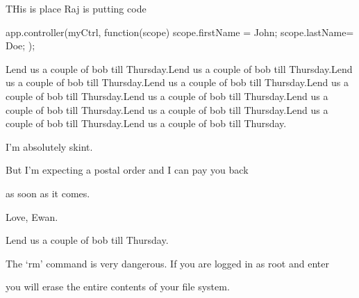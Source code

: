 \documentclass[letterpaper,10pt,english]{sphinxmanual}
\begin{document}
\begin{sphinxVerbatim}[commandchars=\\\{\}]
   
   
\end{sphinxVerbatim}

\begin{DUlineblock}{0em}
\item[] THis is place Raj is putting code
\end{DUlineblock}

\begin{sphinxVerbatim}[commandchars=\\\{\}]
app.controller(\PYGZdq{}myCtrl\PYGZdq{}, function(\PYGZdl{}scope) \PYGZob{}
  \PYGZdl{}scope.firstName = \PYGZdq{}John\PYGZdq{};
  \PYGZdl{}scope.lastName= \PYGZdq{}Doe\PYGZdq{};
\PYGZcb{});
\end{sphinxVerbatim}

\begin{DUlineblock}{0em}
\item[] Lend us a couple of bob till Thursday.Lend us a couple of bob till Thursday.Lend us a couple of bob till Thursday.Lend us a couple of bob till Thursday.Lend us a couple of bob till Thursday.Lend us a couple of bob till Thursday.Lend us a couple of bob till Thursday.Lend us a couple of bob till Thursday.Lend us a couple of bob till Thursday.Lend us a couple of bob till Thursday.
\item[] I’m absolutely skint.
\item[] But I’m expecting a postal order and I can pay you back
\item[]
\begin{DUlineblock}{\DUlineblockindent}
\item[] as soon as it comes.
\end{DUlineblock}
\item[] Love, Ewan.
\item[] Lend us a couple of bob till Thursday.
\end{DUlineblock}

The ‘rm’ command is very dangerous.  If you are logged
in as root and enter

\begin{sphinxVerbatim}[commandchars=\\\{\}]
 
  
\end{sphinxVerbatim}
\noindent
you will erase the entire contents of your file system.
\end{document}
